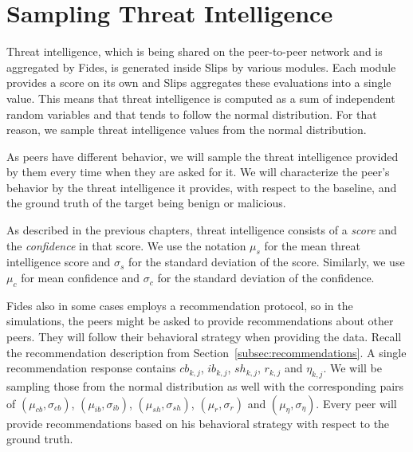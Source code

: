 \section{Sampling Threat Intelligence}
\label{sec:sampling-threat-intelligence}
Threat intelligence, which is being shared on the peer-to-peer network and is aggregated by Fides, is generated inside Slips by various modules.
Each module provides a score on its own and Slips aggregates these evaluations into a single value. 
This means that threat intelligence is computed as a sum of independent random variables and that tends to follow the normal distribution. 
For that reason, we sample threat intelligence values from the normal distribution.

As peers have different behavior, we will sample the threat intelligence provided by them every time when they are asked for it.
We will characterize the peer's behavior by the threat intelligence it provides, with respect to the baseline, and the ground truth of the target being benign or malicious.

As described in the previous chapters, threat intelligence consists of a \textit{score} and the \textit{confidence} in that score.
We use the notation $\mu_{s}$ for the mean threat intelligence score and $\sigma_{s}$ for the standard deviation of the score. 
Similarly, we use $\mu_{c}$ for mean confidence and $\sigma_{c}$ for the standard deviation of the confidence. 

Fides also in some cases employs a recommendation protocol, so in the simulations, the peers might be asked to provide recommendations about other peers.
They will follow their behavioral strategy when providing the data. 
Recall the recommendation description from Section~\ref{subsec:recommendations}. A single recommendation response contains $cb_{k,j}$, $ib_{k,j}$, $sh_{k,j}$, $r_{k,j}$ and $\eta_{k,j}$. 
We will be sampling those from the normal distribution as well with the corresponding pairs of $(\mu_{cb}, \sigma_{cb})$, $(\mu_{ib}, \sigma_{ib})$, $(\mu_{sh}, \sigma_{sh})$, $(\mu_{r}, \sigma_{r})$ and $(\mu_{\eta}, \sigma_{\eta})$.
Every peer will provide recommendations based on his behavioral strategy with respect to the ground truth.

